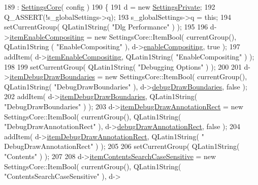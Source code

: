 \begin{DoxyCode}
189   : \hyperlink{classOkular_1_1SettingsCore_ab493ee7918aa2d83ef411a66a8d64cfb}{SettingsCore}( config )
190 \{
191   d = \textcolor{keyword}{new} \hyperlink{classOkular_1_1SettingsPrivate}{SettingsPrivate};
192   Q\_ASSERT(!s\_globalSettings->q);
193   s\_globalSettings->q = \textcolor{keyword}{this};
194   setCurrentGroup( QLatin1String( \textcolor{stringliteral}{"Dlg Performance"} ) );
195 
196   d->\hyperlink{classOkular_1_1SettingsPrivate_a5fd46d913aaaf8001026e7a4c6409910}{itemEnableCompositing} = \textcolor{keyword}{new} SettingsCore::ItemBool( currentGroup(), QLatin1String
      ( \textcolor{stringliteral}{"EnableCompositing"} ), d->\hyperlink{classOkular_1_1SettingsPrivate_abe6f51bb5f2d64f130073b20104b3cf7}{enableCompositing}, \textcolor{keyword}{true} );
197   addItem( d->\hyperlink{classOkular_1_1SettingsPrivate_a5fd46d913aaaf8001026e7a4c6409910}{itemEnableCompositing}, QLatin1String( \textcolor{stringliteral}{"EnableCompositing"} ) );
198 
199   setCurrentGroup( QLatin1String( \textcolor{stringliteral}{"Debugging Options"} ) );
200 
201   d->\hyperlink{classOkular_1_1SettingsPrivate_a17c1efc22296d9ca79cb5e2b90beb840}{itemDebugDrawBoundaries} = \textcolor{keyword}{new} SettingsCore::ItemBool( currentGroup(), 
      QLatin1String( \textcolor{stringliteral}{"DebugDrawBoundaries"} ), d->\hyperlink{classOkular_1_1SettingsPrivate_a9966867211ca301a2d11f3016a9db3ca}{debugDrawBoundaries}, \textcolor{keyword}{false} );
202   addItem( d->\hyperlink{classOkular_1_1SettingsPrivate_a17c1efc22296d9ca79cb5e2b90beb840}{itemDebugDrawBoundaries}, QLatin1String( \textcolor{stringliteral}{"DebugDrawBoundaries"} ) );
203   d->\hyperlink{classOkular_1_1SettingsPrivate_aa2ab33eec8e6aaf70a5d5af48f242f01}{itemDebugDrawAnnotationRect} = \textcolor{keyword}{new} SettingsCore::ItemBool( currentGroup(), 
      QLatin1String( \textcolor{stringliteral}{"DebugDrawAnnotationRect"} ), d->\hyperlink{classOkular_1_1SettingsPrivate_a040f796657dfe0905ed71b629e9b9009}{debugDrawAnnotationRect}, \textcolor{keyword}{false} );
204   addItem( d->\hyperlink{classOkular_1_1SettingsPrivate_aa2ab33eec8e6aaf70a5d5af48f242f01}{itemDebugDrawAnnotationRect}, QLatin1String( \textcolor{stringliteral}{"
      DebugDrawAnnotationRect"} ) );
205 
206   setCurrentGroup( QLatin1String( \textcolor{stringliteral}{"Contents"} ) );
207 
208   d->\hyperlink{classOkular_1_1SettingsPrivate_a31bdbcadec0d77d5f5ce1083d8d70232}{itemContentsSearchCaseSensitive} = \textcolor{keyword}{new} SettingsCore::ItemBool( 
      currentGroup(), QLatin1String( \textcolor{stringliteral}{"ContentsSearchCaseSensitive"} ), d->

\end{DoxyCode}
